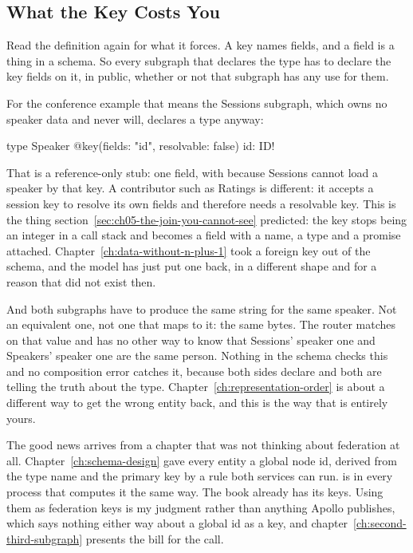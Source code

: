 \subsection{What the Key Costs You}

%
Read the definition again for what it forces. A key names fields, and a field
is a thing in a schema. So every subgraph that declares the type has to declare
the key fields on it, in public, whether or not that subgraph has any use for
them.

%
For the conference example that means the Sessions subgraph, which owns no
speaker data and never will, declares a  type anyway:

\begin{graphqlsdl}
type Speaker @key(fields: "id", resolvable: false) {
  id: ID!
}
\end{graphqlsdl}

%
That is a reference-only stub: one field, with 
because Sessions cannot load a speaker by that key. A contributor such as
Ratings is different: it accepts a session key to resolve its own fields and
therefore needs a resolvable key. This is the
thing section~\ref{sec:ch05-the-join-you-cannot-see} predicted: the key stops
being an integer in a call stack and becomes a field with a name, a type and a
promise attached. Chapter~\ref{ch:data-without-n-plus-1} took a foreign key out
of the schema, and the model has just put one back, in a different shape and for
a reason that did not exist then.

%
And both subgraphs have to produce the same string for the same speaker. Not an
equivalent one, not one that maps to it: the same bytes. The router matches on
that value and has no other way to know that Sessions' speaker one and Speakers'
speaker one are the same person. Nothing in the schema checks this and no
composition error catches it, because both sides declare  and
both are telling the truth about the type. Chapter~\ref{ch:representation-order}
is about a different way to get the wrong entity back, and this is the way that
is entirely yours.

%
The good news arrives from a chapter that was not thinking about federation at
all. Chapter~\ref{ch:schema-design} gave every entity a global node id, derived
from the type name and the primary key by a rule both services can run.
 is  in every process that computes it the
same way. The book already has its keys. Using them as federation keys is my
judgment rather than anything Apollo publishes, which says nothing either way
about a global id as a key, and chapter~\ref{ch:second-third-subgraph} presents
the bill for the call.

